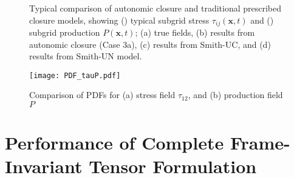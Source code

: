 %
\begin{figure}
	\ContinuedFloat
	\centering \hspace{1.5cm}
	\label{F:Smith_UC_P}
\end{figure}
%
\begin{figure}
	\ContinuedFloat
	\caption{Typical comparison of autonomic closure and traditional prescribed closure models, showing () typical subgrid stress $\tau_{ij}(\mathbf{x},t)$ and () subgrid production $P(\mathbf{x},t)$; (a) true fields, (b) results from autonomic closure (Case 3a), (c) results from Smith-UC, and (d) results from Smith-UN model.}
	\label{F:Smith_UC}
\end{figure}
%
%



%
\begin{figure}
	\begin{center} 
	\texttt{[image: PDF\_tauP.pdf]}
	\caption{Comparison of PDFs for (a) stress field $\tau_{12}$, and (b) production field $P$}
	\label{F:Smith_PDF}
	\end{center}
\end{figure}
%
%


\section{Performance of Complete Frame-Invariant Tensor Formulation} 
\label{sec:10C}


